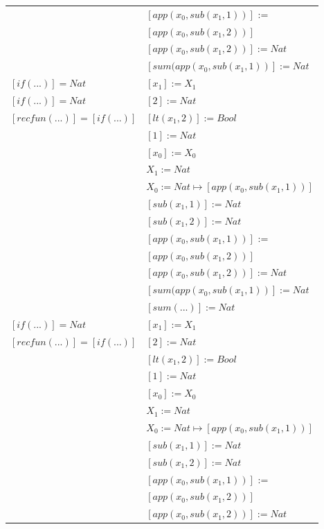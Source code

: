 \begin{exercise}
\begin{description}
\begin{center}
\begin{longtable}{ | l | l | }
			     & $[app(x_0, sub(x_1,1))]$ := \\
			     & $[app(x_0, sub(x_1,2))]$\\ 
			     & $[app(x_0, sub(x_1,2))] := Nat$ \\
			     & $[sum(app(x_0, sub(x_1,1))] := Nat$ \\
                    \hline 
                        $[if(...)] = Nat$ & $[x_1] := X_1$\\
                        $[if(...)] = Nat$ & $[2] := Nat$\\
                        $[recfun(...)] = [if(...)]$ & $[lt(x_1 , 2)] := Bool$\\
                        & $[1] := Nat$\\ 
                        & $[x_0] := X_0$\\  
			     & $X_1 := Nat$\\
			     & $X_0 := Nat \mapsto [app(x_0, sub(x_1,1))]$\\
			     & $[sub(x_1,1)] := Nat$\\
			     & $[sub(x_1,2)] := Nat$ \\
			     & $[app(x_0, sub(x_1,1))]$ := \\
			     & $[app(x_0, sub(x_1,2))]$\\ 
			     & $[app(x_0, sub(x_1,2))] := Nat$ \\
			     & $[sum(app(x_0, sub(x_1,1))] := Nat$ \\
			     & $[sum(...)] := Nat$ \\
                     \hline 
                        $[if(...)] = Nat$ & $[x_1] := X_1$\\
                        $[recfun(...)] = [if(...)]$ & $[2] := Nat$\\ 
                        & $[lt(x_1 , 2)] := Bool$\\ 
                        & $[1] := Nat$\\  
			     & $[x_0] := X_0$\\
			     & $X_1 := Nat$\\
			     & $X_0 := Nat \mapsto [app(x_0, sub(x_1,1))]$\\
			     & $[sub(x_1,1)] := Nat$\\
			     & $[sub(x_1,2)] := Nat$ \\
			     & $[app(x_0, sub(x_1,1))]$ := \\
			     & $[app(x_0, sub(x_1,2))]$\\ 
			     & $[app(x_0, sub(x_1,2))] := Nat$ \\

\end{longtable}
\end{center}
\end{description}
\end{exercise}
